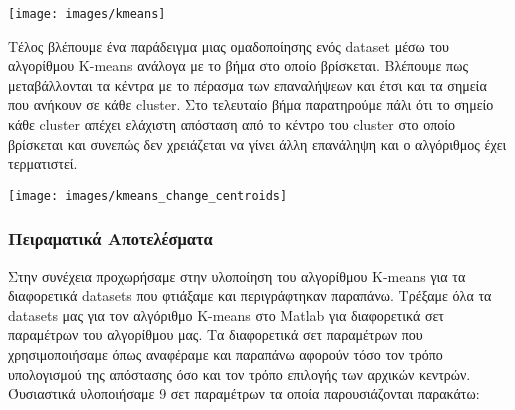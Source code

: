 \noindent\begin{minipage}{\linewidth}
    \centering
    \texttt{[image: images/kmeans]}
    \label{fig:kmeans}
\end{minipage}

Τέλος βλέπουμε ένα παράδειγμα μιας ομαδοποίησης ενός dataset μέσω του αλγορίθμου K-means ανάλογα με το βήμα στο οποίο βρίσκεται. Βλέπουμε πως μεταβάλλονται τα κέντρα με το πέρασμα των επαναλήψεων και έτσι και τα σημεία που ανήκουν σε κάθε cluster. Στο τελευταίο βήμα παρατηρούμε πάλι ότι το σημείο κάθε cluster απέχει ελάχιστη απόσταση από το κέντρο του cluster στο οποίο βρίσκεται και συνεπώς δεν χρειάζεται να γίνει άλλη επανάληψη και ο αλγόριθμος έχει τερματιστεί.

\noindent\begin{minipage}{\linewidth}
    \centering
    \texttt{[image: images/kmeans\_change\_centroids]}
    \label{fig:kmeans_change_centroids}
\end{minipage}

\subsubsection{Πειραματικά Αποτελέσματα}

Στην συνέχεια προχωρήσαμε στην υλοποίηση του αλγορίθμου K-means για τα διαφορετικά datasets που φτιάξαμε και περιγράφτηκαν παραπάνω. Τρέξαμε όλα τα datasets μας για τον αλγόριθμο K-means στο Matlab για διαφορετικά σετ παραμέτρων του αλγορίθμου μας. Τα διαφορετικά σετ παραμέτρων που χρησιμοποιήσαμε όπως αναφέραμε και παραπάνω αφορούν τόσο τον τρόπο υπολογισμού της απόστασης όσο και τον τρόπο επιλογής των αρχικών κεντρών. Όυσιαστικά υλοποιήσαμε 9 σετ παραμέτρων τα οποία παρουσιάζονται παρακάτω:

